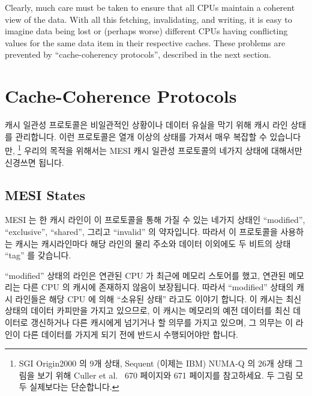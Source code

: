Clearly, much care must be taken to ensure that all CPUs maintain
a coherent view of the data.
With all this fetching, invalidating, and writing, it is easy to
imagine data being lost or (perhaps worse) different CPUs having
conflicting values for the same data item in their respective
caches.
These problems are prevented by ``cache-coherency protocols'',
described in the next section.
\fi

\section{Cache-Coherence Protocols}
\label{sec:app:whymb:Cache-Coherence Protocols}

캐시 일관성 프로토콜은 비일관적인 상황이나 데이터 유실을 막기 위해 캐시 라인
상태를 관리합니다.
이런 프로토콜은 열개 이상의 상태를 가져서 매우 복잡할 수 있습니다만, \footnote{
	SGI Origin2000 의 9개 상태, Sequent (이제는 IBM) NUMA-Q 의 26개 상태
	그림을 보기 위해 Culler et al.~\cite{DavidECuller1999} 670 페이지와 671
	페이지를 참고하세요.
	두 그림 모두 실제보다는 단순합니다.}
우리의 목적을 위해서는 MESI 캐시 일관성 프로토콜의 네가지 상태에 대해서만
신경쓰면 됩니다.

\subsection{MESI States}
\label{sec:app:whymb:MESI States}

MESI 는 한 캐시 라인이 이 프로토콜을 통해 가질 수 있는 네가지 상태인
``modified'', ``exclusive'', ``shared'', 그리고 ``invalid'' 의 약자입니다.
따라서 이 프로토콜을 사용하는 캐시는 캐시라인마다 해당 라인의 물리 주소와
데이터 이외에도 두 비트의 상태 ``tag'' 를 갖습니다.

``modified'' 상태의 라인은 연관된 CPU 가 최근에 메모리 스토어를 했고, 연관된
메모리는 다른 CPU 의 캐시에 존재하지 않음이 보장됩니다.
따라서 ``modified'' 상태의 캐시 라인들은 해당 CPU 에 의해 ``소유된 상태''
라고도 이야기 합니다.
이 캐시는 최신 상태의 데이터 카피만을 가지고 있으므로, 이 캐시는 메모리의 예전
데이터를 최신 데이터로 갱신하거나 다른 캐시에게 넘기거나 할 의무를 가지고
있으며, 그 의무는 이 라인이 다른 데이터를 가지게 되기 전에 반드시 수행되어야만
합니다.
\iffalse

